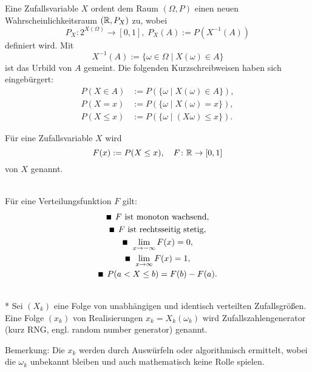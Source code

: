\noindent
Eine Zufallsvariable $X$ ordent dem Raum $(\Omega,P)$
einen neuen Wahrscheinlichkeitsraum $(\mathbb R,P_X)$ zu, wobei
\begin{equation}
P_X\colon 2^{X(\Omega)}\to [0,1],\; P_X(A):=P(X^{-1}(A))
\end{equation}
definiert wird. Mit
\begin{equation}
X^{-1}(A) := \{\omega\in\Omega\mid X(\omega)\in A\}
\end{equation}
ist das Urbild von $A$ gemeint.
Die folgenden Kurzschreibweisen haben sich
eingebürgert:
\begin{align}
P(X\in A) &:= P(\{\omega\mid X(\omega)\in A\}),\\
P(X=x) &:= P(\{\omega\mid X(\omega)=x\}),\\
P(X\le x) &:= P(\{\omega\mid (X\omega)\le x\}).
\end{align}

\begin{definition}[Verteilungsfunktion]\mbox{}\newline
Für eine Zufallsvariable $X$ wird
\begin{equation}
F(x):=P(X\le x),\quad F\colon\mathbb R\to [0,1]
\end{equation}
 von $X$ genannt.
\end{definition}

\noindent
{}\\
Für eine Verteilungsfunktion $F$ gilt:
\begin{gather}
\text{\scriptsize $\blacksquare$}\;\, F\text{ ist monoton wachsend},\\
\text{\scriptsize $\blacksquare$}\;\, F\text{ ist rechtsseitig stetig},\\
\text{\scriptsize $\blacksquare$}\;\, \lim\limits_{x\to -\infty} F(x) = 0,\\
\text{\scriptsize $\blacksquare$}\;\, \lim\limits_{x\to\infty} F(x)=1,\\
\text{\scriptsize $\blacksquare$}\;\, P(a<X\le b) = F(b)-F(a).
\end{gather}

\begin{definition}[Zufallszahlengenerator]\mbox{}\\*
Sei $(X_k)$ eine Folge von unabhängigen und
identisch verteilten Zufallsgrößen. Eine Folge
$(x_k)$ von Realisierungen $x_k=X_k(\omega_k)$ wird
Zufallszahlengenerator (kurz RNG, engl. random number generator)
genannt.
\end{definition}

\noindent
Bemerkung: Die $x_k$ werden durch Auswürfeln oder algorithmisch
ermittelt, wobei die $\omega_k$ unbekannt bleiben und auch
mathematisch keine Rolle spielen.

